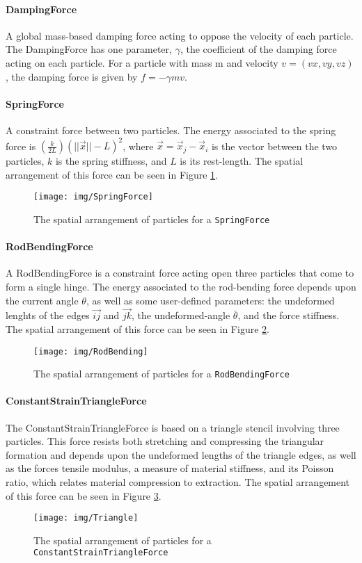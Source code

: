 \documentclass[letterpaper]{article}
\newcommand\subsubsubsection[1]{\paragraph{#1}}
\begin{document}
\subsubsubsection{DampingForce}

A global mass-based damping force acting to oppose the velocity of
each particle. The DampingForce has one parameter, $\gamma$, the
coefficient of the damping force acting on each particle. For a
particle with mass m and velocity $v = (vx, vy, vz)$, the damping force
is given by $f = -\gamma mv$.

\subsubsubsection{SpringForce}

A constraint force between two particles. The energy associated to the
spring force is $(\frac{k}{2L}) (||\vec{x}||−L)^2$, where $\vec{x} =
\vec{x}_j −\vec{x}_i$ is the vector between the two particles, $k$ is
the spring stiffness, and $L$ is its rest-length. The spatial
arrangement of this force can be seen in Figure \ref{fig:springf}.

\begin{figure}
  \centering
  \texttt{[image: img/SpringForce]}
  \caption{The spatial arrangement of particles for a \texttt{SpringForce}}
  \label{fig:springf}
\end{figure}

\subsubsubsection{RodBendingForce}

A RodBendingForce is a constraint force acting open three particles
that come to form a single hinge. The energy associated to the
rod-bending force depends upon the current angle $\theta$, as well as
some user-defined parameters: the undeformed lenghts of the edges
$\vec{ij}$ and $\vec{jk}$, the undeformed-angle $\bar{\theta}$, and
the force stiffness. The spatial arrangement of this force can be seen
in Figure \ref{fig:rodf}.

\begin{figure}
  \centering
  \texttt{[image: img/RodBending]}
  \caption{The spatial arrangement of particles for a \texttt{RodBendingForce}}
  \label{fig:rodf}
\end{figure}

\subsubsubsection{ConstantStrainTriangleForce}

The ConstantStrainTriangleForce is based on a triangle stencil
involving three particles. This force resists both stretching and
compressing the triangular formation and depends upon the undeformed
lengths of the triangle edges, as well as the forces tensile modulus,
a measure of material stiffness, and its Poisson ratio, which relates
material compression to extraction. The spatial arrangement of this
force can be seen in Figure \ref{fig:trianglef}.

\begin{figure}
  \centering
  \texttt{[image: img/Triangle]}
  \caption{The spatial arrangement of particles for a \texttt{ConstantStrainTriangleForce}}
  \label{fig:trianglef}
\end{figure}
\end{document}
